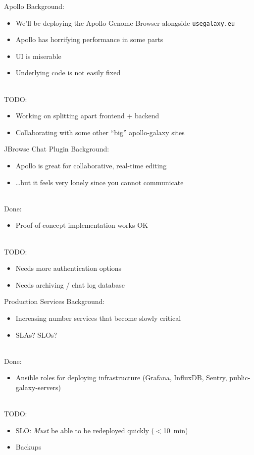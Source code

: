 \documentclass[12pt]{ufrslides}
\begin{document}
	\begin{frame}{Apollo}
		Background:
		\begin{itemize}
			\item We'll be deploying the Apollo Genome Browser alongside \texttt{usegalaxy.eu}
			\item Apollo has horrifying performance in some parts
			\item UI is miserable
			\item Underlying code is not easily fixed
		\end{itemize}
		\ \\[0.5cm]
		TODO:
		\begin{itemize}
			\item Working on splitting apart frontend + backend
			\item Collaborating with some other ``big'' apollo-galaxy sites
		\end{itemize}
	\end{frame}

	\begin{frame}{JBrowse Chat Plugin}
		Background:
		\begin{itemize}
			\item Apollo is great for collaborative, real-time editing
			\item \ldots{}but it feels very lonely since you cannot communicate
		\end{itemize}
		\ \\[0.5cm]
		Done:
		\begin{itemize}
			\item Proof-of-concept implementation works OK
		\end{itemize}
		\ \\[0.5cm]
		TODO:
		\begin{itemize}
			\item Needs more authentication options
			\item Needs archiving / chat log database
		\end{itemize}
	\end{frame}

	\begin{frame}{Production Services}
		Background:
		\begin{itemize}
			\item Increasing number services that become slowly critical
			\item SLAs? SLOs?
		\end{itemize}
		\ \\[0.5cm]
		Done:
		\begin{itemize}
			\item Ansible roles for deploying infrastructure (Grafana, InfluxDB, Sentry, public-galaxy-servers)
		\end{itemize}
		\ \\[0.5cm]
		TODO:
		\begin{itemize}
			\item SLO: \emph{Must} be able to be redeployed quickly ($<$\SI{10}{\minute})
			\item Backups
		\end{itemize}
	\end{frame}
\end{document}

